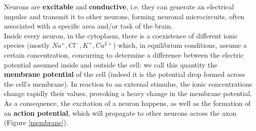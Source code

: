 \documentclass[12pt, a4paper]{article}
\begin{document}
		
	
	Neurons are \textbf{excitable} and \textbf{conductive}, i.e. they can generate an electrical impulse and transmit it to other neurons, forming neuronal microcircuits, often associated with a specific area and/or task of the brain. \\
	Inside every neuron, in the cytoplasm, there is a coexistence of different ionic species (mostly $Na^+, Cl^-, K^+, Ca^{2+}$) which, in equilibrium conditions, assume a certain concentration, concurring to determine a difference between the electric potential assumed inside and outside the cell: we call this quantity the \textbf{membrane potential} of the cell (indeed it is the potential drop formed across the cell's membrane).  In reaction to an external stimulus, the ionic concentrations change rapidly their values, provoking a heavy change in the membrane potential. As a consequence, the excitation of a neuron happens, as well as the formation of an \textbf{action potential}, which will propagate to other neurons across the axon (Figure \ref{membrane}). 
\end{document}
